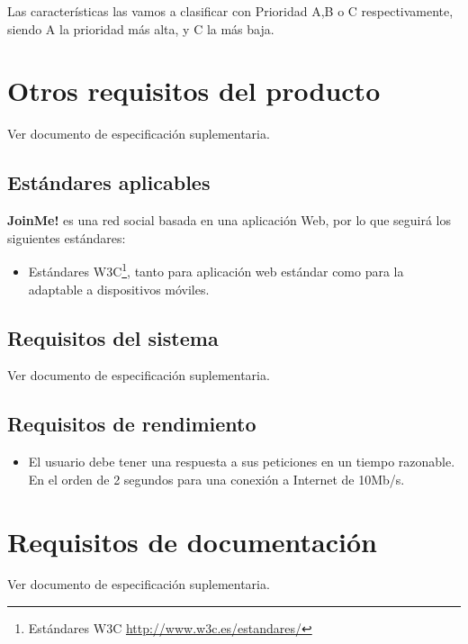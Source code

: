 \documentclass[12pt, a4paper, titlepage]{article}
\begin{document}
Las características las vamos a clasificar con Prioridad A,B o C respectivamente, siendo A la prioridad más alta, y C la más baja.


\section{Otros requisitos del producto}

Ver documento de especificación suplementaria.

\subsection{Estándares aplicables}

\textbf{JoinMe!} es una red social basada en una aplicación Web, por lo que seguirá los siguientes estándares:
\begin{itemize}
\item Estándares W3C\footnote{Estándares W3C \url{http://www.w3c.es/estandares/}}, tanto para aplicación web estándar como para la adaptable a dispositivos móviles.
\end{itemize}

\subsection{Requisitos del sistema}

Ver documento de especificación suplementaria.

\subsection{Requisitos de rendimiento}


\begin{itemize}
\item El usuario debe tener una respuesta a sus peticiones en un tiempo razonable. En el orden de 2 segundos para una conexión a Internet de 10Mb/s.

\end{itemize}

\section{Requisitos de documentación}

Ver documento de especificación suplementaria.



\end{document}

